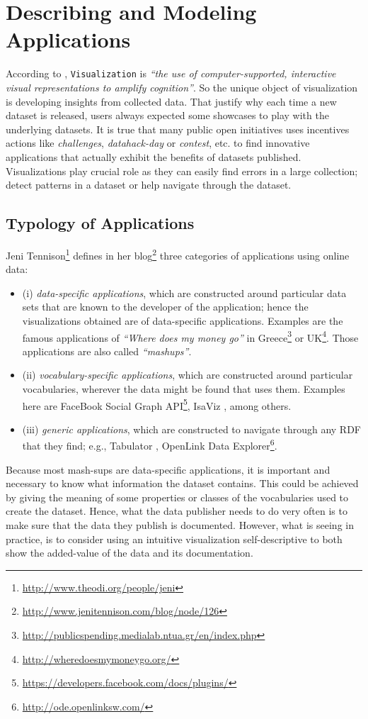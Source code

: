\section{Describing and Modeling Applications} 
\label{sec:apps}
According to \cite{card99}, \texttt{Visualization} is \textit{ ``the use of computer-supported, interactive visual representations to amplify cognition''}. So the unique object of visualization is developing insights from collected data. That justify why each time a new dataset is released, users always expected some showcases to play with the underlying datasets. It is true that many public open initiatives uses incentives actions like \textit{challenges}, \textit{datahack-day} or \textit{contest}, etc. to find innovative applications that actually exhibit the benefits of datasets published. Visualizations play crucial role as they can easily find errors in a large collection; detect patterns in a dataset or help navigate through the dataset. 

\subsection{Typology of Applications}
Jeni Tennison\footnote{\url{http://www.theodi.org/people/jeni}} defines  in her blog\footnote{\url{http://www.jenitennison.com/blog/node/126}} three categories of applications using online data:
\begin{itemize}
\item (i) \textit{data-specific applications}, which are constructed around particular data sets that are known to the developer of the application; hence the visualizations obtained are of data-specific applications. Examples are the famous applications of \textit{``Where does my money go''}  in Greece\footnote{\url{http://publicspending.medialab.ntua.gr/en/index.php}} or UK\footnote{\url{http://wheredoesmymoneygo.org/}}. Those applications are also called \textit{``mashups''}. 
\item (ii) \textit{vocabulary-specific applications}, which are constructed around particular vocabularies, wherever the data might be found that uses them. Examples here are FaceBook Social Graph API\footnote{\url{https://developers.facebook.com/docs/plugins/}}, IsaViz  \cite{isaviz}, among others.
\item (iii) \textit{generic applications}, which are constructed to navigate through any RDF that they find; e.g., Tabulator \cite{tabulator06}, OpenLink Data Explorer\footnote{\url{http://ode.openlinksw.com/}}. 

\end{itemize}
Because most mash-sups are data-specific applications, it is important and necessary to  know what information the dataset contains. This could be achieved by giving the meaning of some properties or classes of the vocabularies used to create the dataset. Hence, what the data publisher needs to do very often is to make sure that the data they publish is documented. However, what is seeing in practice, is to consider using an intuitive visualization self-descriptive to both show the added-value of the data and its documentation.

